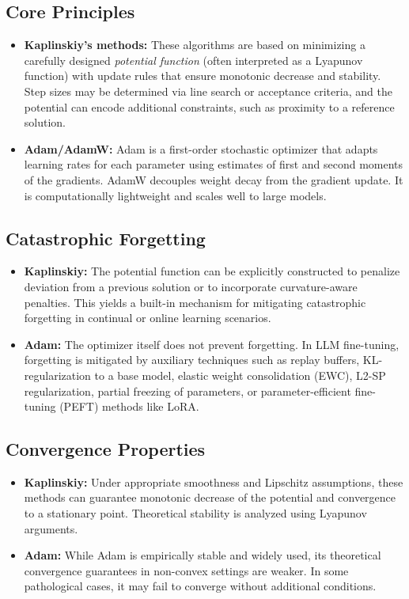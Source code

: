 \documentclass[12pt]{article}
\begin{document}
\subsection{Core Principles}
\begin{itemize}
    \item \textbf{Kaplinskiy’s methods:} These algorithms are based on minimizing a carefully designed \emph{potential function} (often interpreted as a Lyapunov function) with update rules that ensure monotonic decrease and stability. Step sizes may be determined via line search or acceptance criteria, and the potential can encode additional constraints, such as proximity to a reference solution.
    \item \textbf{Adam/AdamW:} Adam is a first-order stochastic optimizer that adapts learning rates for each parameter using estimates of first and second moments of the gradients. AdamW decouples weight decay from the gradient update. It is computationally lightweight and scales well to large models.
\end{itemize}

\subsection{Catastrophic Forgetting}
\begin{itemize}
    \item \textbf{Kaplinskiy:} The potential function can be explicitly constructed to penalize deviation from a previous solution or to incorporate curvature-aware penalties. This yields a built-in mechanism for mitigating catastrophic forgetting in continual or online learning scenarios.
    \item \textbf{Adam:} The optimizer itself does not prevent forgetting. In LLM fine-tuning, forgetting is mitigated by auxiliary techniques such as replay buffers, KL-regularization to a base model, elastic weight consolidation (EWC), L2-SP regularization, partial freezing of parameters, or parameter-efficient fine-tuning (PEFT) methods like LoRA.
\end{itemize}

\subsection{Convergence Properties}
\begin{itemize}
    \item \textbf{Kaplinskiy:} Under appropriate smoothness and Lipschitz assumptions, these methods can guarantee monotonic decrease of the potential and convergence to a stationary point. Theoretical stability is analyzed using Lyapunov arguments.
    \item \textbf{Adam:} While Adam is empirically stable and widely used, its theoretical convergence guarantees in non-convex settings are weaker. In some pathological cases, it may fail to converge without additional conditions.
\end{itemize}
\end{document}

